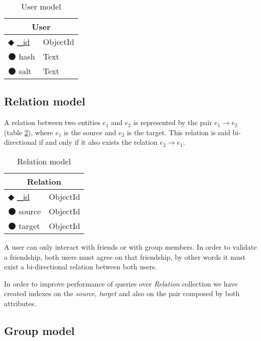 \begin{table}[!htb]
\centering
\caption{User model}
\label{table:user}
    \begin{tabular}{|ll|}
        \hline
        \multicolumn{2}{|c|}{\textbf{User}}         \\ \hline
        $\Diamondblack$ \underline{\_id}  & ObjectId  \\ 
        $\medbullet$ hash           & Text          \\ 
        $\medbullet$ salt      & Text               \\ \hline
    \end{tabular}
\end{table}

\subsection{Relation model}

A relation between two entities $e_1$ and $e_2$ is represented by the pair $e_1\rightarrow e_2$ (table \ref{table:relation}), where $e_1$ is the source and $e_2$ is the target. This relation is said bi-directional if and only if it also exists the relation $e_2\rightarrow e_1$.

\begin{table}[!htb]
\centering
\caption{Relation model}
\label{table:relation}
    \begin{tabular}{|ll|}
        \hline
        \multicolumn{2}{|c|}{\textbf{Relation}}     \\ \hline
        $\Diamondblack$ \underline{\_id}  & ObjectId  \\ 
        $\medbullet$ source           & ObjectId    \\ 
        $\medbullet$ target      & ObjectId         \\ \hline
    \end{tabular}
\end{table}

A user can only interact with friends or with group members. In order to validate a friendship, both users must agree on that friendship, by other words it must exist a bi-directional relation between both users.

In order to improve performance of queries over \emph{Relation} collection we have created indexes on the \emph{source}, \emph{target} and also on the pair composed by both attributes.

\subsection{Group model}

